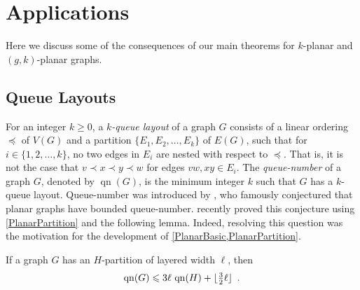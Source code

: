 \documentclass{patmorin}
\DeclareMathOperator{\tw}{tw}
\DeclareMathOperator{\qn}{qn}
\DeclarePairedDelimiter{\floor}{\lfloor}{\rfloor}
\renewcommand{\le}{\leqslant}
\renewcommand{\geq}{\geqslant}
\begin{document}
% 

\section{Applications}
\label{Applications}

Here we discuss some of the consequences of our main theorems for $k$-planar and $(g,k)$-planar graphs. 

\subsection{Queue Layouts}

For an integer $k\geq 0$, a \textit{$k$-queue layout} of a graph $G$ consists of a linear ordering $\preceq$ of $V(G)$ and a partition $\{E_1,E_2,\dots,E_k\}$ of $E(G)$, such that for $i\in\{1,2,\dots,k\}$, no two edges in $E_i$ are nested with respect to $\preceq$. That is, it is not the case that $v\prec x \prec y \prec w$ for edges $vw,xy\in E_i$. The \textit{queue-number} of a graph $G$, denoted by $\qn(G)$, is the minimum integer $k$ such that $G$ has a $k$-queue layout. Queue-number was introduced by \citet{HLR92}, who famously conjectured that planar graphs have bounded queue-number. \citet{dujmovic.joret.ea:planar} recently proved this conjecture using \cref{PlanarPartition} and the following lemma. Indeed, resolving this question was the motivation for the development of \cref{PlanarBasic,PlanarPartition}.

\begin{lem}
\label{qn}
If a graph $G$ has an $H$-partition of layered width $\ell$, then 
$$\qn(G)\le 3 \ell \, \qn(H) + \floor{\tfrac{3}{2}\ell}\enspace.$$
\end{lem}
\end{document}
